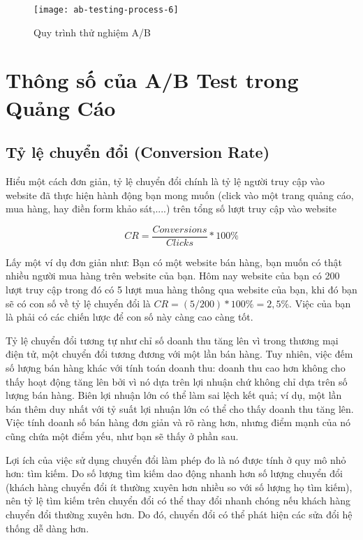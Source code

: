 \begin{figure}[ht]
	\centering
	\texttt{[image: ab-testing-process-6]}
	\caption{Quy trình thử nghiệm A/B}
\end{figure}

\section{Thông số của A/B Test trong Quảng Cáo}

\subsection{Tỷ lệ chuyển đổi (Conversion Rate)}

Hiểu một cách đơn giản, tỷ lệ chuyển đổi chính là tỷ lệ người truy cập vào website đã thực hiện hành động bạn mong muốn (click vào một trang quảng cáo, mua hàng, hay điền form khảo sát,....) trên tổng số lượt truy cập vào website

\begin{displaymath}
	CR = \frac{Conversions}{Clicks} * 100\%
\end{displaymath}

Lấy một ví dụ đơn giản như: Bạn có một website bán hàng, bạn muốn có thật nhiều người mua hàng trên website của bạn. Hôm nay website của bạn có 200 lượt truy cập trong đó có 5 lượt mua hàng thông qua website của bạn, khi đó bạn sẽ có con số về tỷ lệ chuyển đổi là $CR = (5/200) * 100\% = 2,5\%$. Việc của bạn là phải có các chiến lược để con số này càng cao càng tốt.

Tỷ lệ chuyển đổi tương tự như chỉ số doanh thu tăng lên vì trong thương mại điện tử, một chuyển đổi tương đương với một lần bán hàng. Tuy nhiên, việc đếm số lượng bán hàng khác với tính toán doanh thu: doanh thu cao hơn không cho thấy hoạt động tăng lên bởi vì nó dựa trên lợi nhuận chứ không chỉ dựa trên số lượng bán hàng. Biên lợi nhuận lớn có thể làm sai lệch kết quả; ví dụ, một lần bán thêm duy nhất với tỷ suất lợi nhuận lớn có thể cho thấy doanh thu tăng lên. Việc tính doanh số bán hàng đơn giản và rõ ràng hơn, nhưng điểm mạnh của nó cũng chứa một điểm yếu, như bạn sẽ thấy ở phần sau.

Lợi ích của việc sử dụng chuyển đổi làm phép đo là nó được tính ở quy mô nhỏ hơn: tìm kiếm. Do số lượng tìm kiếm dao động nhanh hơn số lượng chuyển đổi (khách hàng chuyển đổi ít thường xuyên hơn nhiều so với số lượng họ tìm kiếm), nên tỷ lệ tìm kiếm trên chuyển đổi có thể thay đổi nhanh chóng nếu khách hàng chuyển đổi thường xuyên hơn. Do đó, chuyển đổi có thể phát hiện các sửa đổi hệ thống dễ dàng hơn.

